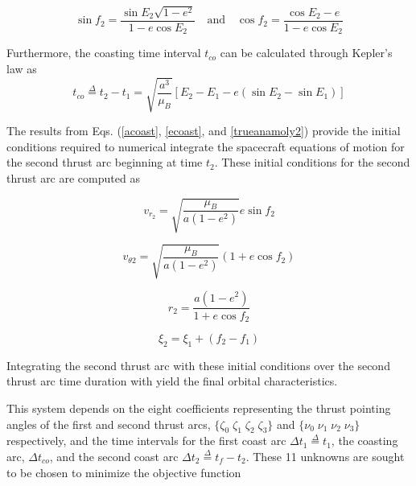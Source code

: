 \begin{equation}
\sin{f_2} = \dfrac{\sin{E_2}\sqrt{1-e^2}}{1-e\cos{E_2}} \quad \text{and} \quad
\cos{f_2} = \dfrac{\cos{E_2}-e}{1-e\cos{E_2}}
\label{trueanamoly2}
\end{equation}

\noindent Furthermore, the coasting time interval $t_{co}$ can be calculated through Kepler's law as
\begin{equation}
t_{co} \overset{\Delta}{=} t_2 - t_1 = \sqrt{\dfrac{a^3}{\mu_B}}[E_2-E_1-e(\sin{E_2}-\sin{E_1})]
\end{equation}

\noindent The results from Eqs. (\ref{acoast}, \ref{ecoast}, and \ref{trueanamoly2}) provide the initial conditions required to numerical integrate 
the spacecraft equations of motion for the second thrust arc beginning at time $t_2$. These initial conditions for the second thrust arc are computed as

\begin{equation}
v_{r_2} = \sqrt{\dfrac{\mu_B}{a(1-e^2)}}e\sin{f_2}
\label{vr2}
\end{equation}

\begin{equation}
    v_{\theta2} = \sqrt{\dfrac{\mu_B}{a(1-e^2)}}(1+e\cos{f_2})
    \label{vtheta2}
\end{equation}

\begin{equation}
r_2 = \dfrac{a(1-e^2)}{1+e\cos{f_2}}
\label{r2}
\end{equation}

\begin{equation}
\xi_2 = \xi_1 + (f_2-f_1)
\end{equation}

\noindent Integrating the second thrust arc with these initial conditions over the second thrust arc time duration with yield the final orbital characteristics. \newline

This system depends on the eight coefficients representing the thrust pointing angles of the first and second thrust arcs, 
$\{\zeta_0 \; \zeta_1 \; \zeta_2 \; \zeta_3 \}$ and $\{\nu_0 \; \nu_1 \; \nu_2 \; \nu_3 \}$ respectively, and the time intervals for the first coast arc
$\Delta t_1 \overset{\Delta}{=} t_1$, the coasting arc, $\Delta t_{co}$, and the second coast arc $\Delta t_2 \overset{\Delta}{=} t_f-t_2 $. These 11 unknowns are sought to be chosen to minimize the objective function 

